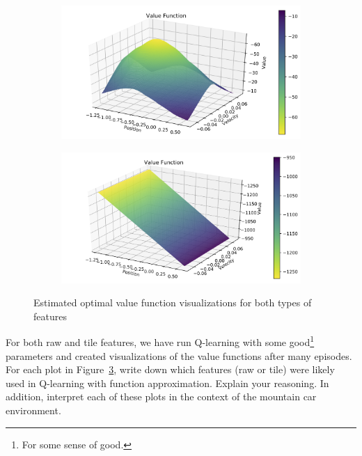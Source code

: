\documentclass[11pt,addpoints,answers]{exam}
\begin{document}
\begin{questions}
    \begin{your_solution}[title=Comment,height=5cm,width=15cm]
    \end{your_solution}
    \clearpage
    \begin{figure}[H]
        \centering
        \begin{subfigure}{0.5\textwidth}
            \includegraphics[width=\linewidth]{figs/value_A.png}
            \caption{}
            \label{fig:value_a}
        \end{subfigure}%
        \begin{subfigure}{0.5\textwidth}
            \includegraphics[width=\linewidth]{figs/value_B.png}
            \caption{}
            \label{fig:value_b}
        \end{subfigure}
        \caption{Estimated optimal value function visualizations for both types of features}
        \label{fig:value}
    \end{figure}
    
    \question[2] For both raw and tile features, we have run Q-learning with some good\footnote{For some sense of good.} parameters and created visualizations of the value functions after many episodes. For each plot in Figure~\ref{fig:value}, write down which features (raw or tile) were likely used in Q-learning with function approximation. Explain your reasoning. In addition, interpret each of these plots in the context of the mountain car environment.
    

\end{questions}
\end{document}
